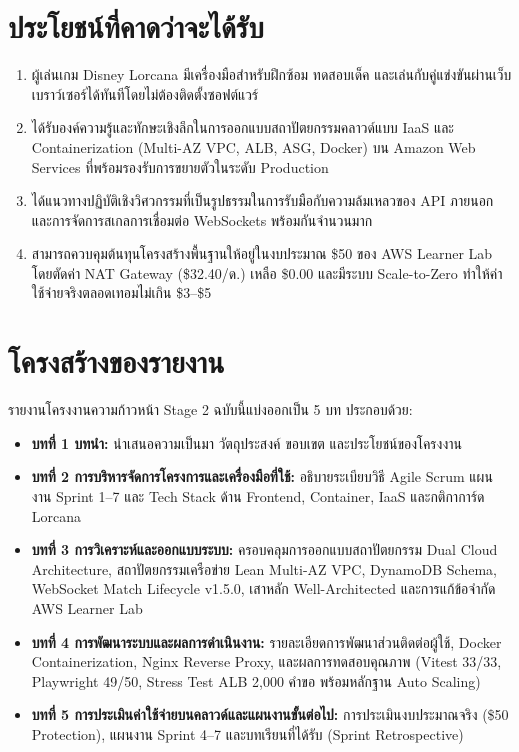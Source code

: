 \documentclass[12pt,a4paper]{report}
\begin{document}
\section{ประโยชน์ที่คาดว่าจะได้รับ}
\begin{enumerate}
    \item ผู้เล่นเกม Disney Lorcana มีเครื่องมือสำหรับฝึกซ้อม ทดสอบเด็ค และเล่นกับคู่แข่งขันผ่านเว็บเบราว์เซอร์ได้ทันทีโดยไม่ต้องติดตั้งซอฟต์แวร์
    \item ได้รับองค์ความรู้และทักษะเชิงลึกในการออกแบบสถาปัตยกรรมคลาวด์แบบ IaaS และ Containerization (Multi-AZ VPC, ALB, ASG, Docker) บน Amazon Web Services ที่พร้อมรองรับการขยายตัวในระดับ Production
    \item ได้แนวทางปฏิบัติเชิงวิศวกรรมที่เป็นรูปธรรมในการรับมือกับความล้มเหลวของ API ภายนอก และการจัดการสเกลการเชื่อมต่อ WebSockets พร้อมกันจำนวนมาก
    \item สามารถควบคุมต้นทุนโครงสร้างพื้นฐานให้อยู่ในงบประมาณ \$50 ของ AWS Learner Lab โดยตัดค่า NAT Gateway (\$32.40/ด.) เหลือ \$0.00 และมีระบบ Scale-to-Zero ทำให้ค่าใช้จ่ายจริงตลอดเทอมไม่เกิน \$3--\$5
\end{enumerate}

\section{โครงสร้างของรายงาน}
รายงานโครงงานความก้าวหน้า Stage 2 ฉบับนี้แบ่งออกเป็น 5 บท ประกอบด้วย:
\begin{itemize}
    \item \textbf{บทที่ 1 บทนำ:} นำเสนอความเป็นมา วัตถุประสงค์ ขอบเขต และประโยชน์ของโครงงาน
    \item \textbf{บทที่ 2 การบริหารจัดการโครงการและเครื่องมือที่ใช้:} อธิบายระเบียบวิธี Agile Scrum แผนงาน Sprint 1--7 และ Tech Stack ด้าน Frontend, Container, IaaS และกติกาการ์ด Lorcana
    \item \textbf{บทที่ 3 การวิเคราะห์และออกแบบระบบ:} ครอบคลุมการออกแบบสถาปัตยกรรม Dual Cloud Architecture, สถาปัตยกรรมเครือข่าย Lean Multi-AZ VPC, DynamoDB Schema, WebSocket Match Lifecycle v1.5.0, เสาหลัก Well-Architected และการแก้ข้อจำกัด AWS Learner Lab
    \item \textbf{บทที่ 4 การพัฒนาระบบและผลการดำเนินงาน:} รายละเอียดการพัฒนาส่วนติดต่อผู้ใช้, Docker Containerization, Nginx Reverse Proxy, และผลการทดสอบคุณภาพ (Vitest 33/33, Playwright 49/50, Stress Test ALB 2,000 คำขอ พร้อมหลักฐาน Auto Scaling)
    \item \textbf{บทที่ 5 การประเมินค่าใช้จ่ายบนคลาวด์และแผนงานขั้นต่อไป:} การประเมินงบประมาณจริง (\$50 Protection), แผนงาน Sprint 4--7 และบทเรียนที่ได้รับ (Sprint Retrospective)
\end{itemize}
\end{document}
